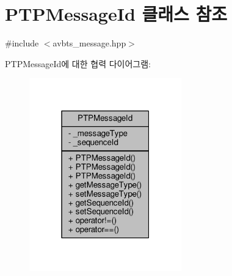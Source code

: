 \hypertarget{class_p_t_p_message_id}{}\section{P\+T\+P\+Message\+Id 클래스 참조}
\label{class_p_t_p_message_id}


{\ttfamily \#include $<$avbts\+\_\+message.\+hpp$>$}



P\+T\+P\+Message\+Id에 대한 협력 다이어그램\+:
\nopagebreak
\begin{figure}[H]
\begin{center}
\leavevmode
\includegraphics[width=187pt]{class_p_t_p_message_id__coll__graph}
\end{center}
\end{figure}
